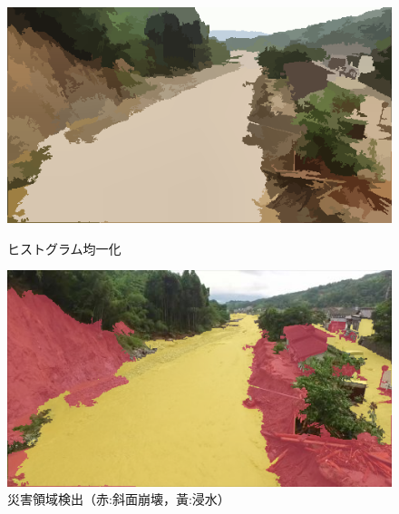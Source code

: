 \documentclass[a4paper, twocolumn, xelatex, 9pt, ja=standard, Ligatures=TeX]{bxjsarticle}
\begin{document}
	\begin{figure}[t]
		\begin{minipage}{0.48\hsize}
			\centering
			\includegraphics[width=\linewidth]{img/equalization.png}
			\caption{ヒストグラム均一化}
			\label{img04}
		\end{minipage}
		\begin{minipage}{0.48\hsize}
			\centering
			\includegraphics[width=\linewidth]{img/detection.png}
			\caption{災害領域検出（赤:斜面崩壊，黃:浸水）}
			\label{img05}
		\end{minipage}
	\end{figure}
\end{document}
